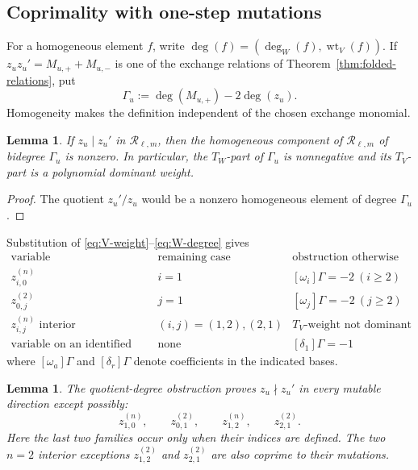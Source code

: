 \documentclass[11pt]{amsart}
\newtheorem{lemma}[theorem]{Lemma}
\theoremstyle{definition}
\theoremstyle{remark}
\newcommand{\cR}{\mathcal R}
\newcommand{\wt}{\operatorname{wt}}
\begin{document}
\subsection{Coprimality with one-step mutations}
\label{subsec:first-mutation-coprimality}

For a homogeneous element $f$, write
$\deg(f)=(\deg_W(f),\wt_V(f))$.  If
$z_uz_u'=M_{u,+}+M_{u,-} $
is one of the exchange relations of Theorem~\ref{thm:folded-relations},
put
\[ \Gamma_u:=\deg(M_{u,+})-2\deg(z_u). \]
Homogeneity makes the definition independent of the chosen exchange monomial.

\begin{lemma}\label{lem:quotient-degree-obstruction}
If $z_u\mid z_u'$ in $\cR_{\ell,m}$, then the homogeneous component of
$\cR_{\ell,m}$ of bidegree $\Gamma_u$ is nonzero.  In particular, the
$T_W$-part of $\Gamma_u$ is nonnegative and its $T_V$-part is a
polynomial dominant weight.
\end{lemma}

\begin{proof}
The quotient $z_u'/z_u$ would be a nonzero homogeneous element of degree
$\Gamma_u$.
\end{proof}

Substitution of \eqref{eq:V-weight}--\eqref{eq:W-degree} gives
\begin{equation*}
\begin{array}{c|c|c}
  \text{variable}&\text{remaining case}&\text{obstruction otherwise}\\
  \hline
  z_{i,0}^{(n)}&i=1&[\omega_i]\Gamma=-2\ (i\ge2)\\
  z_{0,j}^{(2)}&j=1&[\omega_j]\Gamma=-2\ (j\ge2)\\
  z_{i,j}^{(n)}\text{ interior}&(i,j)=(1,2),(2,1)
    &\text{$T_V$-weight not dominant}\\
  \text{variable on an identified boundary}&\text{none}&[\delta_1]\Gamma=-1
 \end{array}
\end{equation*}
where $[\omega_a]\Gamma$ and $[\delta_r]\Gamma$ denote coefficients in
the indicated bases.

\begin{lemma}\label{lem:degree-reduction}
The quotient-degree obstruction proves $z_u\nmid z_u'$ in every mutable
direction except possibly:
\begin{equation}
 z_{1,0}^{(n)},\qquad z_{0,1}^{(2)},\qquad
 z_{1,2}^{(n)},\qquad z_{2,1}^{(2)}.
 \label{eq:degree-exception-list}
\end{equation}
Here the last two families occur only when their indices are defined.
The two $n=2$ interior exceptions
$z_{1,2}^{(2)}$ and $z_{2,1}^{(2)}$ are also coprime to their mutations.
\end{lemma}
\end{document}
